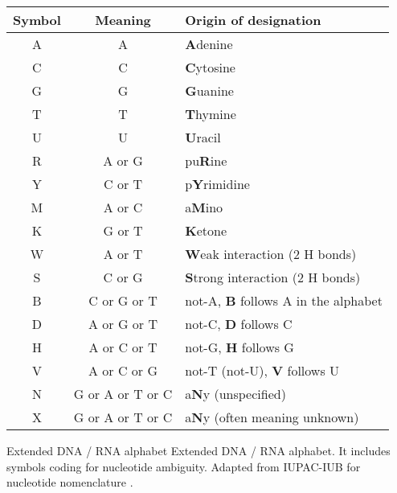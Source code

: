 
\enlargethispage{1cm}%

\renewcommand{\arraystretch}{1.2}%

\begin{table}[]
\begin{center}
\begin{tabular}{|c|c|l|}\hline
\textbf{Symbol} & \textbf{Meaning} & \textbf{Origin of designation} \\ %
\hline
\hline
 A &       A          & \textbf{A}denine \\
 C &       C          & \textbf{C}ytosine \\
 G &       G          & \textbf{G}uanine \\
 T &       T          & \textbf{T}hymine \\
 U &       U          & \textbf{U}racil \\[1.2ex]
 R &     A or G       & pu\textbf{R}ine \\
 Y &     C or T       & p\textbf{Y}rimidine \\[1.2ex]
 M &     A or C       & a\textbf{M}ino \\
 K &     G or T       & \textbf{K}etone \\[1.2ex]
 W &     A or T       & \textbf{W}eak interaction (2 H bonds) \\
 S &     C or G       & \textbf{S}trong interaction (2 H bonds) \\[1.2ex]
 B &   C or G or T    & not-A, \textbf{B} follows A in the alphabet \\
 D &   A or G or T    & not-C, \textbf{D} follows C \\
 H &   A or C or T    & not-G, \textbf{H} follows G \\
 V &   A or C or G    & not-T (not-U), \textbf{V} follows U \\[1.2ex]
 N & G or A or T or C & a\textbf{N}y (unspecified) \\
 X & G or A or T or C & a\textbf{N}y (often meaning unknown) \\
\hline
\end{tabular}
          {Extended DNA / RNA alphabet}%
          {Extended DNA / RNA alphabet.}%
          {%
  It includes symbols coding
  for nucleotide ambiguity. Adapted from IUPAC-IUB
  for nucleotide nomenclature \citep{cornish-bowden1985:2582368}.
           }%
\end{center}
\end{table}

